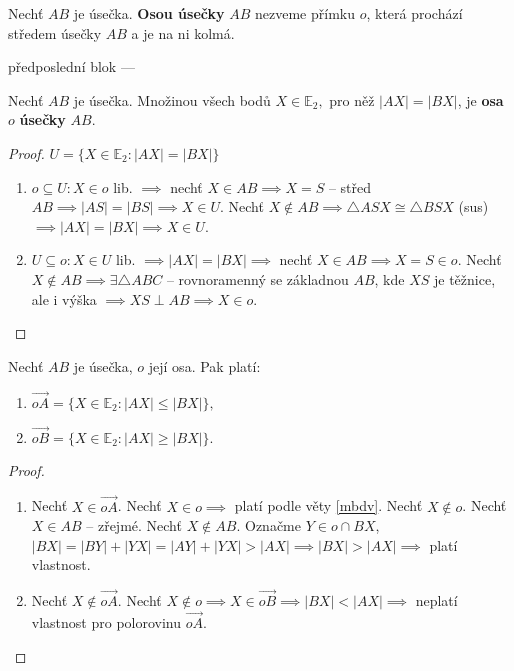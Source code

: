 \begin{definition}
  Nechť $AB$ je úsečka. \textbf{Osou úsečky} $AB$ nezveme přímku $o$, která prochází středem úsečky $AB$ a je na ni kolmá.
\end{definition}


předposlední blok ---
\begin{veta}\label{mbdv}
  Nechť $AB$ je úsečka. Množinou všech bodů $X\in \mathbb E_2,$ pro něž $|AX|=|BX|$, je \textbf{osa} $o$ \textbf{úsečky} $AB$.
\end{veta}

\begin{proof}
  $U=\{ X\in \mathbb E_2: |AX|=|BX| \}$
  \begin{enumerate}[$i.$]
    \item $o \subseteq U: X \in o$ lib. $\implies$ nechť $X\in AB \implies X=S$ -- střed $AB \implies |AS|=|BS| \implies X \in U.$ Nechť $X \notin AB \implies \triangle ASX \cong \triangle BSX$ (sus) $\implies |AX|=|BX| \implies X \in U$.
    \item $U \subseteq o: X \in U$ lib. $\implies |AX|=|BX| \implies$ nechť $X \in AB \implies X=S \in o.$ Nechť $X \notin AB \implies \exists \triangle ABC$ -- rovnoramenný se základnou $AB$, kde $XS$ je těžnice, ale i výška $\implies XS \perp AB \implies X \in o.$ \qedhere
  \end{enumerate}
\end{proof}

\begin{veta}
  Nechť $AB$ je úsečka, $o$ její osa. Pak platí:
  \begin{enumerate}[$i.$]
    \item $\overrightarrow{oA}=\{ X\in \mathbb E_2:|AX|\leq |BX| \},$
    \item $\overrightarrow{oB}=\{ X \in \mathbb E_2 : |AX| \geq |BX| \}.$
  \end{enumerate}
\end{veta}

\begin{proof}
  \begin{enumerate}[$i.$]
    \item Nechť $X\in \overrightarrow{oA}$. Nechť $X\in o\implies$ platí podle věty \ref{mbdv}. Nechť $X\notin o$. Nechť $X\in AB$ -- zřejmé. Nechť $X\notin AB$. Označme $Y\in o \cap BX$, $|BX|=|BY|+|YX|=|AY|+|YX|>|AX|\implies |BX|>|AX|\implies$ platí vlastnost.
    \item Nechť $X\notin \overrightarrow{oA}$. Nechť $X\notin o \implies X\in \overrightarrow{oB}\implies |BX|<|AX|\implies$ neplatí vlastnost pro polorovinu $\overrightarrow{oA}.$ \qedhere
\end{enumerate}
\end{proof}

